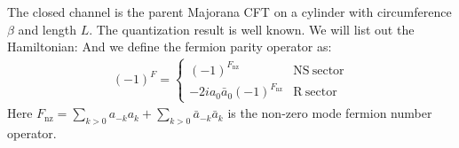 The closed channel is the parent Majorana CFT on a cylinder with circumference $ \beta $ and length $ L $. The quantization result is well known. We will list out the Hamiltonian:
And we define the fermion parity operator as:
\begin{align}
  (-1)^F = \left\{\begin{array}{ll} (-1)^{F_\mathrm{nz}} & \mathrm{NS\ sector}\\ - 2 ia_0\bar{a}_0(-1)^{F_\mathrm{nz}} & \mathrm{R\ sector}\end{array}\right.
\end{align}
Here $ F_\mathrm{nz} = \sum_{k>0} a_{-k} a_k + \sum_{k>0} \bar{a}_{-k} \bar{a}_k $ is the non-zero mode fermion number operator.


